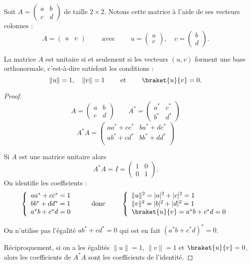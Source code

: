 \documentclass[11pt,class=report,crop=false]{standalone}
\begin{document}
Soit $A = \begin{pmatrix}a&b\\c&d\end{pmatrix}$
de taille $2\times2$.
Notons cette matrice à l'aide de ses vecteurs colonnes :
$$A = \begin{pmatrix}u & v\end{pmatrix}
\qquad\text{ avec }\qquad
u = \begin{pmatrix}a\\c\end{pmatrix},\quad v = \begin{pmatrix}b\\d\end{pmatrix}.$$

\begin{proposition}
\label{prop:unitaire}
La matrice $A$ est unitaire si et seulement si les vecteurs $(u,v)$ forment une base orthonormale, c'est-à-dire satisfont les conditions :
$$\|u\|=1,\quad \|v\|=1 \qquad \text{ et } \qquad \braket{u}{v} = 0.$$
\end{proposition}

\begin{proof}
$$A = \begin{pmatrix}a&b\\c&d\end{pmatrix}\qquad
A^* = \begin{pmatrix}a^*&c^*\\b^*&d^*\end{pmatrix}$$
$$A^*A = \begin{pmatrix}
aa^* + cc^* & ba^* + dc^* \\
ab^* + cd^* & bb^* + dd^* \\
\end{pmatrix}$$

Si $A$ est une matrice unitaire alors 
$$A^*A = I = \begin{pmatrix}1&0\\0&1\end{pmatrix}.$$
On identifie les coefficients :
$$
\left\{
\begin{array}{l}
aa^* + cc^* = 1 \\
bb^* + dd^* = 1 \\
a^*b + c^*d = 0 \\
\end{array}
\right.
\qquad
\text{ donc }
\qquad
\left\{
\begin{array}{l}
\|u\|^2 = |a|^2+|c|^2 = 1 \\
\|v\|^2 =  |b|^2+|d|^2 = 1 \\
\braket{u}{v} = a^*b + c^*d = 0 \\
\end{array}
\right.$$

On n'utilise pas l'égalité $ab^* + cd^*=0$ qui est en fait $(a^*b + c^*d)^* = 0$.

Réciproquement, si on a les égalités $\|u\|=1$, $\|v\|=1$ et $\braket{u}{v} = 0$, alors les coefficients de $A^*A$ sont les coefficients de l'identité.
\end{proof}
\end{document}
